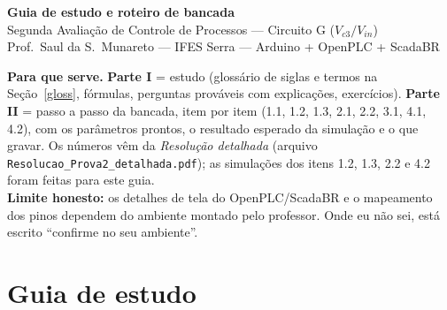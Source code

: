 \documentclass[11pt,a4paper]{article}
\newcommand{\Vc}[1]{V_{c#1}}
\newcommand{\Vin}{V_{in}}
\begin{document}
\begin{center}
{\LARGE\bfseries Guia de estudo e roteiro de bancada}\\[4pt]
{\Large Segunda Avaliação de Controle de Processos --- Circuito G ($\Vc3/\Vin$)}\\[6pt]
Prof.\ Saul da S.\ Munareto --- IFES Serra --- Arduino + OpenPLC + ScadaBR
\end{center}
\begin{tcolorbox}[colback=gray!6,colframe=gray!60]
\textbf{Para que serve.} \textbf{Parte I} = estudo (glossário de siglas e termos na Seção~\ref{gloss}, fórmulas, perguntas prováveis com explicações, exercícios). \textbf{Parte II} = passo a passo da bancada, item por item (1.1, 1.2, 1.3, 2.1, 2.2, 3.1, 4.1, 4.2), com os parâmetros prontos, o resultado esperado da simulação e o que gravar. Os números vêm da \emph{Resolução detalhada} (arquivo \texttt{Resolucao\_Prova2\_detalhada.pdf}); as simulações dos itens 1.2, 1.3, 2.2 e 4.2 foram feitas para este guia.\\
\textbf{Limite honesto:} os detalhes de tela do OpenPLC/ScadaBR e o mapeamento dos pinos dependem do ambiente montado pelo professor. Onde eu não sei, está escrito ``confirme no seu ambiente''.
\end{tcolorbox}
\tableofcontents
\newpage

\part{Guia de estudo}
\end{document}

